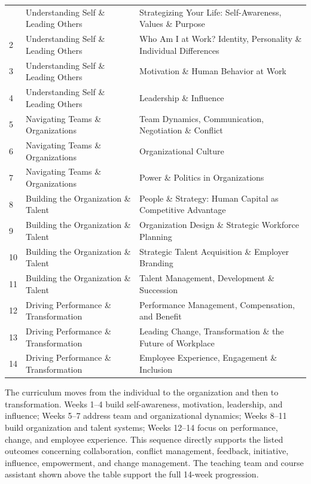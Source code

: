 \begin{tabularx}{\textwidth}{M{1.8cm}YY}&Understanding Self \& Leading Others&Strategizing Your Life: Self-Awareness, Values \& Purpose\\
2&Understanding Self \& Leading Others&Who Am I at Work? Identity, Personality \& Individual Differences\\
3&Understanding Self \& Leading Others&Motivation \& Human Behavior at Work\\
4&Understanding Self \& Leading Others&Leadership \& Influence\\
5&Navigating Teams \& Organizations&Team Dynamics, Communication, Negotiation \& Conflict\\
6&Navigating Teams \& Organizations&Organizational Culture\\
7&Navigating Teams \& Organizations&Power \& Politics in Organizations\\
8&Building the Organization \& Talent&People \& Strategy: Human Capital as Competitive Advantage\\
9&Building the Organization \& Talent&Organization Design \& Strategic Workforce Planning\\
10&Building the Organization \& Talent&Strategic Talent Acquisition \& Employer Branding\\
11&Building the Organization \& Talent&Talent Management, Development \& Succession\\
12&Driving Performance \& Transformation&Performance Management, Compensation, and Benefit\\
13&Driving Performance \& Transformation&Leading Change, Transformation \& the Future of Workplace\\
14&Driving Performance \& Transformation&Employee Experience, Engagement \& Inclusion\\
\end{tabularx}
\begin{visualexplanation}
The curriculum moves from the individual to the organization and then to transformation. Weeks 1--4 build self-awareness, motivation, leadership, and influence; Weeks 5--7 address team and organizational dynamics; Weeks 8--11 build organization and talent systems; Weeks 12--14 focus on performance, change, and employee experience. This sequence directly supports the listed outcomes concerning collaboration, conflict management, feedback, initiative, influence, empowerment, and change management. The teaching team and course assistant shown above the table support the full 14-week progression.
\end{visualexplanation}

